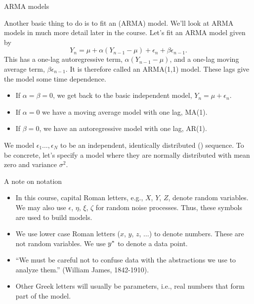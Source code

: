 \begin{frame}{ARMA models}

Another basic thing to do is to fit an  (ARMA) model. 
We'll look at ARMA models in much more detail later in the course.
Let's fit an ARMA model given by
\begin{equation}
Y_n = \mu + \alpha(Y_{n-1}-\mu) + \epsilon_n + \beta \epsilon_{n-1}.
\end{equation}
This has a one-lag autoregressive term, $\alpha(Y_{n-1}-\mu)$, and a one-lag moving average term, $\beta \epsilon_{n-1}$. It is therefore called an ARMA(1,1) model. These lags give the model some time dependence. 

\begin{itemize}

\item If $\alpha=\beta=0$, we get back to the basic independent model, $Y_n = \mu + \epsilon_n$.
 
\item If $\alpha=0$ we have a moving average model with one lag, MA(1).

\item If $\beta=0$, we have an autoregressive model with one lag, AR(1).

\end{itemize}

We model $\epsilon_1\dots,\epsilon_N$ to be an independent, identically distributed (\iid) sequence. 
To be concrete, let's specify a model where they are normally distributed with mean zero and variance $\sigma^2$.

\end{frame}

\begin{frame}{A note on notation}

\begin{itemize}

\item In this course, capital Roman letters, e.g., $X$, $Y$, $Z$, denote random variables. We may also use $\epsilon$, $\eta$, $\xi$, $\zeta$ for random noise processes. Thus, these symbols are used to build models.

\item We use lower case Roman letters ($x$, $y$, $z$, $\dots$) to denote numbers. These are not random variables. We use $y^*$ to denote a data point.

\item  ``We must be careful not to confuse data with the abstractions we use to analyze them.'' (William James, 1842-1910).

\item Other Greek letters will usually be parameters, i.e., real numbers that form part of the model.

\end{itemize}

\end{frame}


